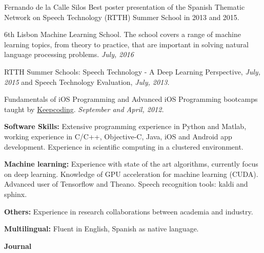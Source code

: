 \documentclass[10pt]{scrartcl}
\begin{document}
\begin{cv}{\spacedallcaps Fernando de la Calle Silos}
\vspace{0.5em}
Best poster presentation of the Spanish Thematic Network on Speech Technology (RTTH) Summer School in 2013 and 2015.



\vspace{2em}
{\bfseries{}} 

6th Lisbon Machine Learning School. The school covers a range of machine learning topics, from theory to practice, that are important in solving natural language processing problems.  \textit{July, 2016}	

\vspace{0.5em}
RTTH Summer Schools: Speech Technology - A Deep Learning Perspective, \textit{July, 2015} and Speech Technology Evaluation, \textit{July, 2013.}
	
\vspace{0.5em}
Fundamentals of iOS Programming and Advanced iOS Programming bootcamps taught by  \href{https://keepcoding.io}{Keepcoding}. \textit{September and April, 2012.} %



\vspace{2em}
{\bfseries{}} 

\textbf{Software Skills:} Extensive programming experience in Python and Matlab, working experience in C/C++, Objective-C, Java, iOS and Android app development. Experience in scientific computing in a clustered environment.

\textbf{Machine learning:}  Experience with state of the art algorithms, currently focus on deep learning. Knowledge of GPU acceleration for machine learning (CUDA). Advanced user of Tensorflow and Theano. Speech recognition tools: kaldi and sphinx. 

\textbf{Others:} Experience in research collaborations between academia and industry.

\textbf{Multilingual:} Fluent in English, Spanish as native language.



\vspace{1.5em}

{\bfseries{} Journal}
\vspace{0.5em}


\end{cv}
\end{document}
